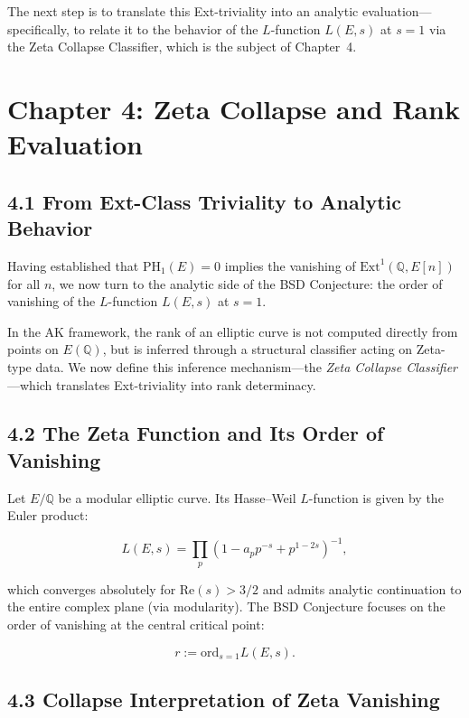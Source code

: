 \documentclass[11pt]{article}
\begin{document}
The next step is to translate this Ext-triviality into an analytic evaluation—specifically, to relate it to the behavior of the $L$-function $L(E,s)$ at $s=1$ via the Zeta Collapse Classifier, which is the subject of Chapter~4.




\section{Chapter 4: Zeta Collapse and Rank Evaluation}

\subsection{4.1 From Ext-Class Triviality to Analytic Behavior}

Having established that $\mathrm{PH}_1(E) = 0$ implies the vanishing of $\mathrm{Ext}^1(\mathbb{Q},E[n])$ for all $n$, we now turn to the analytic side of the BSD Conjecture:  
the order of vanishing of the $L$-function $L(E,s)$ at $s = 1$.

In the AK framework, the rank of an elliptic curve is not computed directly from points on $E(\mathbb{Q})$, but is inferred through a structural classifier acting on Zeta-type data.  
We now define this inference mechanism—the \emph{Zeta Collapse Classifier}—which translates Ext-triviality into rank determinacy.

\subsection{4.2 The Zeta Function and Its Order of Vanishing}

Let $E/\mathbb{Q}$ be a modular elliptic curve.  
Its Hasse–Weil $L$-function is given by the Euler product:

\[
L(E,s) = \prod_p \left(1 - a_p p^{-s} + p^{1 - 2s}\right)^{-1},
\]

which converges absolutely for $\mathrm{Re}(s) > 3/2$ and admits analytic continuation to the entire complex plane (via modularity).  
The BSD Conjecture focuses on the order of vanishing at the central critical point:

\[
r := \mathrm{ord}_{s=1} L(E,s).
\]

\subsection{4.3 Collapse Interpretation of Zeta Vanishing}
\end{document}
